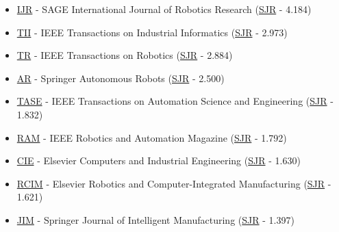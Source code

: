 \begin{itemize}[leftmargin=2em]
	\item \href{http://ijr.sagepub.com/}{IJR} - SAGE International Journal of Robotics Research (\href{http://www.scimagojr.com/journalsearch.php?q=18050\&tip=sid\&clean=0}{SJR} - 4.184)
	\item \href{http://ieeexplore.ieee.org/xpl/RecentIssue.jsp?punumber=9424}{TII} - IEEE Transactions on Industrial Informatics (\href{http://www.scimagojr.com/journalsearch.php?q=144912\&tip=sid\&clean=0}{SJR} - 2.973)
	\item \href{http://ieeexplore.ieee.org/xpl/RecentIssue.jsp?punumber=8860}{TR} - IEEE Transactions on Robotics (\href{http://www.scimagojr.com/journalsearch.php?q=95101\&tip=sid\&clean=0}{SJR} - 2.884)
	\item \href{http://www.springer.com/engineering/robotics/journal/10514}{AR} - Springer Autonomous Robots (\href{http://www.scimagojr.com/journalsearch.php?q=18016\&tip=sid\&clean=0}{SJR} - 2.500)
	\item \href{http://ieeexplore.ieee.org/xpl/RecentIssue.jsp?punumber=8856}{TASE} - IEEE Transactions on Automation Science and Engineering (\href{http://www.scimagojr.com/journalsearch.php?q=17340\&tip=sid\&clean=0}{SJR} - 1.832)
	\item \href{http://ieeexplore.ieee.org/xpl/RecentIssue.jsp?punumber=100}{RAM} - IEEE Robotics and Automation Magazine (\href{http://www.scimagojr.com/journalsearch.php?q=18027\&tip=sid\&clean=0}{SJR} - 1.792)
	\item \href{http://www.journals.elsevier.com/computers-and-industrial-engineering/}{CIE} - Elsevier Computers and Industrial Engineering (\href{http://www.scimagojr.com/journalsearch.php?q=18164\&tip=sid\&clean=0}{SJR} - 1.630)
	\item \href{http://www.journals.elsevier.com/robotics-and-computer-integrated-manufacturing/}{RCIM} - Elsevier Robotics and Computer-Integrated Manufacturing (\href{http://www.scimagojr.com/journalsearch.php?q=18080\&tip=sid\&clean=0}{SJR} - 1.621)
	\item \href{http://www.springer.com/business+\%26+management/production/journal/10845}{JIM} - Springer Journal of Intelligent Manufacturing (\href{http://www.scimagojr.com/journalsearch.php?q=24363\&tip=sid\&clean=0}{SJR} - 1.397)

\end{itemize}
